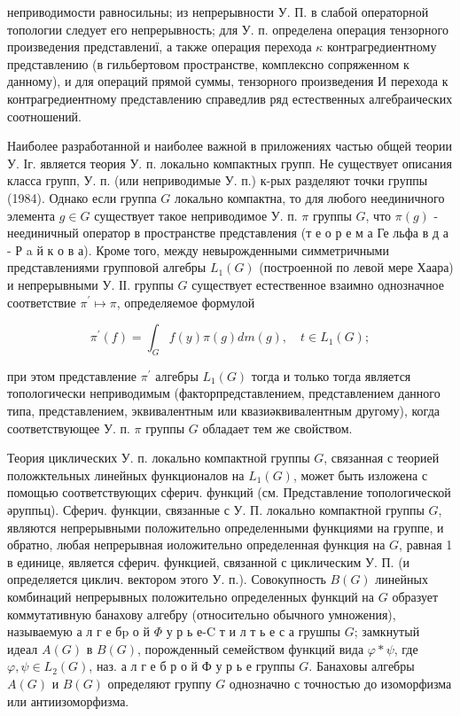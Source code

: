 \documentclass[10pt]{article}
\begin{document}
неприводимости равносильны; из непрерывности У. П. в слабой операторной топологии следует его непрерывность; для У. п. определена операция тензорного произведения представлениї, а также операция перехода $\kappa$ контрагредиентному представлению (в гильбертовом пространстве, комплексно сопряженном к данному), и для операций прямой суммы, тензорного произведения И перехода к контрагредиентному представлению справедлив ряд естественных алгебраических соотношений.



Наиболее разработанной и наиболее важной в приложениях частью общей теории У. Іг. является теория У. п. локально компактных групп. Не существует описания класса групп, У. п. (или неприводимые У. п.) к-рых разделяют точки группы (1984). Однако если группа $G$ локально компактна, то для любого неединичного элемента $g \in G$ существует такое неприводимое У. п. $\pi$ группы $G$, что $\pi(g)$ - неединичный оператор в пространстве представления (т е о р е м а Ге льфа в д а - Р a й к о в а). Кроме того, между невырожденными симметричными представлениями групповой алгебры $L_{1}(G)$ (построенной по левой мере Хаара) и непрерывными У. ІІ. группы $G$ существует естественное взаимно однозначное соответствие $\pi^{\prime} \mapsto \pi$, определяемое формулой



\[

\pi^{\prime}(f)=\int_{G} f(y) \pi(g) d m(g), \quad t \in L_{1}(G) ;

\]



при этом представление $\pi^{\prime}$ алгебры $L_{1}(G)$ тогда и только тогда является топологически неприводимым (факторпредставлением, представлением данного типа, представлением, эквивалентным или квазиәквивалентным другому), когда соответствующее У. п. $\pi$ группы $G$ обладает тем же свойством.



Теория циклических У. п. локально компактной группы $G$, связанная с теорией положктельных линейных функционалов на $L_{1}(G)$, может быть изложена с помощью соответствующих сферич. функций (см. Представление топологической әруппьц). Сферич. функции, связанные с У. П. локально компактной группы $G$, являются непрерывными положительно определенными функциями на группе, и обратно, любая непрерывная иоложительно определенная функция на $G$, равная 1 в единице, является сферич. функцией, связанной с циклическим У. П. (и определяется циклич. вектором этого $У$. п.). Совокупность $B(G)$ линейных комбинаций непрерывных положительно определенных функций на $G$ образует коммутативную банахову алгебру (относительно обычного умножения), называемую а л г е б$\mathrm{p}$ о й $\Phi$ у р ь е-C т и л т ь е с а грушпы $G$; замкнутый идеал $A(G)$ в $B(G)$, порожденный семейством функций вида $\varphi * \psi$, где $\varphi, \psi \in L_{2}(G)$, наз. а л г е б р о й Ф у р ь е группы $G$. Банаховы алгебры $A(G)$ и $B(G)$ определяют группу $G$ однозначно с точностью до изоморфизма или антиизоморфизма.
\end{document}
